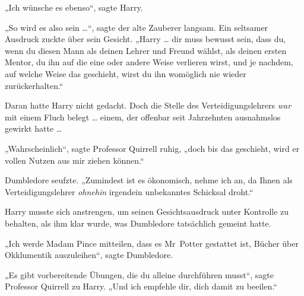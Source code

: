 „Ich wünsche es ebenso“, sagte Harry.

„So wird es also sein …“, sagte der alte Zauberer langsam. Ein seltsamer Ausdruck zuckte über sein Gesicht.
„Harry … dir muss bewusst sein, dass du, wenn du diesen Mann als deinen Lehrer und Freund wählst, als deinen ersten Mentor, du ihn auf die eine oder andere Weise verlieren wirst, und je nachdem, auf welche Weise das geschieht, wirst du ihn womöglich nie wieder zurückerhalten.“

Daran hatte Harry nicht gedacht. Doch die Stelle des Verteidigungslehrers \emph{war} mit einem Fluch belegt … einem, der offenbar seit Jahrzehnten ausnahmslos gewirkt hatte …

„Wahrscheinlich“, sagte Professor Quirrell ruhig, „doch bis das geschieht, wird er vollen Nutzen aus mir ziehen können.“

Dumbledore seufzte.
„Zumindest ist es ökonomisch, nehme ich an, da Ihnen als Verteidigungslehrer \emph{ohnehin} irgendein unbekanntes Schicksal droht.“

Harry musste sich anstrengen, um seinen Gesichtsausdruck unter Kontrolle zu behalten, als ihm klar wurde, was Dumbledore tatsächlich gemeint hatte.

„Ich werde Madam Pince mitteilen, dass es Mr~Potter gestattet ist, Bücher über Okklumentik auszuleihen“, sagte Dumbledore.

„Es gibt vorbereitende Übungen, die du alleine durchführen musst“, sagte Professor Quirrell zu Harry.
„Und ich empfehle dir, dich damit zu beeilen.“

